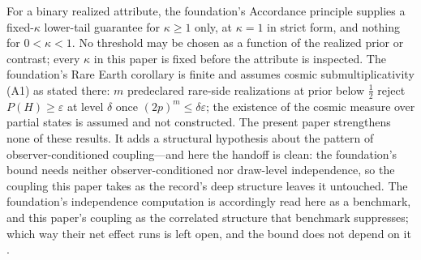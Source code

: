 \documentclass[11pt]{article}
\theoremstyle{definition}
\begin{document}
\begin{tcolorbox}[colback=white, colframe=black, boxrule=0.4pt, title={Imported result, and its grade}]
For a binary realized attribute, the foundation's Accordance principle supplies a fixed-$\kappa$ lower-tail guarantee for $\kappa \ge 1$ only, at $\kappa = 1$ in strict form, and nothing for $0 < \kappa < 1$. No threshold may be chosen as a function of the realized prior or contrast; every $\kappa$ in this paper is fixed before the attribute is inspected. The foundation's Rare Earth corollary is finite and assumes cosmic submultiplicativity (A1) as stated there: $m$ predeclared rare-side realizations at prior below $\tfrac12$ reject $P(H) \ge \varepsilon$ at level $\delta$ once $(2p)^m \le \delta\varepsilon$; the existence of the cosmic measure over partial states is assumed and not constructed. The present paper strengthens none of these results. It adds a structural hypothesis about the pattern of observer-conditioned coupling---and here the handoff is clean: the foundation's bound needs neither observer-conditioned nor draw-level independence, so the coupling this paper takes as the record's deep structure leaves it untouched. The foundation's independence computation is accordingly read here as a benchmark, and this paper's coupling as the correlated structure that benchmark suppresses; which way their net effect runs is left open, and the bound does not depend on it \cite{Nexus}.
\end{tcolorbox}
\end{document}
